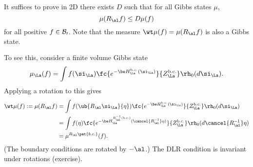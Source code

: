 


It suffices to prove in 2D there exists $D$ such that for all Gibbs states $\mu$,
\[
\mu(R_\al f) \le D\mu(f)
\]
for all positive $f\in \cal B_0$.
Note that the measure $\wt \mu(f) = \mu(R_\al f)$ is also a Gibbs state. 

To see this, consider a finite volume Gibbs state
\[
\mu_{\La}(f) = \int f(\si_\La) \fc{e^{-\be H^{\text{b.c.}}_\La(\si_\La)}}{Z_{\La}^{\text{b.c.}}} \rh_0(d\si_\La).
\]
Applying a rotation to this gives
\begin{align}
\wt\mu(f) := \mu(R_\al f)&= \int f(\ub{R_\al\si_\La}{\eta}) \fc{e^{-\be H^{\text{b.c.}}_\La(\si_\La)} }{Z_{\La}^{\text{b.c.}}} \rh_0(d\si_\La)\\
&=\int f(\eta) \fc{e^{-\be H^{R_\al^{-1}(\text{b.c.})}_\La (\cancel{R_{\al}^{-1}}\eta)} }{Z_{\La}^{\text{b.c.}}} \rh_0(d\cancel{R_{\al}^{-1}}\eta)\\
&= \mu^{R_{\al}\pat{b.c.}}(f).
\end{align}
(The boundary conditions are rotated by $-\al$.)
The DLR condition is invariant under rotations (exercise).




